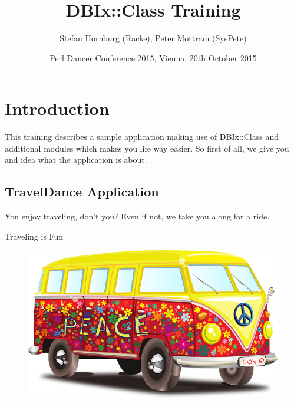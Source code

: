 \title{DBIx::Class Training}
\author{Stefan Hornburg (Racke), Peter Mottram (SysPete)}
\date{Perl Dancer Conference 2015, Vienna, 20th October 2015}


\maketitle



\begin{frame}
  \titlepage
\end{frame}

\cleardoublepage

\tableofcontents

\cleardoublepage

\section{Introduction}

This training describes a sample application making use of
DBIx::Class and additional modules which makes you life
way easier. So first of all, we give you and idea what
the application is about.

\subsection{TravelDance Application}

You enjoy traveling, don't you? Even if not, we take you
along for a ride.

\begin{frame}{Traveling is Fun}
\begin{figure}[!ht]
\centering
\includegraphics[width=1\linewidth]{img/volkswagen.png}
\end{figure}
\end{frame}

